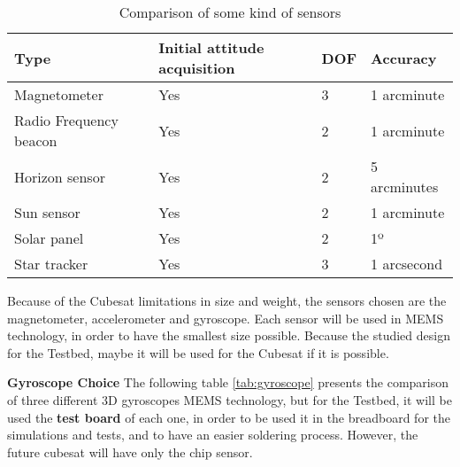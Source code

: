 \begin{table}[H]
\centering
\begin{tabular}{|l|l|l|l|}
\hline\hline
\textbf{Type}		 				 & \textbf{Initial attitude acquisition}	& \textbf{\acrshort{DOF}} & \textbf{Accuracy}			\\	\hline
Magnetometer						 & Yes																		& 3												&		1 arcminute										\\ 	\hline
Radio Frequency beacon   & Yes  																	& 2												& 	1 arcminute										\\ 	\hline
Horizon sensor   				 & Yes 																		& 2 											&   5 arcminutes  								 	\\ 	\hline
Sun sensor    					 & Yes 																		& 2												&   1 arcminute									\\ 	\hline
Solar panel   					 & Yes 																		& 2 											&   1º										\\	\hline
Star tracker    				 & Yes 																		& 3  											&  	1 arcsecond								\\	\hline\hline
\end{tabular}
\caption{Comparison of some kind of sensors \cite{liebe}}\label{tab:comparisonsensor}
\end{table}

Because of the Cubesat limitations in size and weight, the sensors chosen are the magnetometer, accelerometer and gyroscope. Each sensor will be used in \acrshort{MEMS} technology, in order to have the smallest size possible. Because the studied design for the Testbed, maybe it will be used for the Cubesat if it is possible.

\textbf{Gyroscope Choice}
The following table \ref{tab:gyroscope} presents the comparison of three different \acrshort{3D} gyroscopes MEMS technology, but for the Testbed, it will be used the \textbf{test board} of each one, in order to be used it in the breadboard for the simulations and tests, and to have an easier soldering process. However, the future cubesat will have only the chip sensor.

